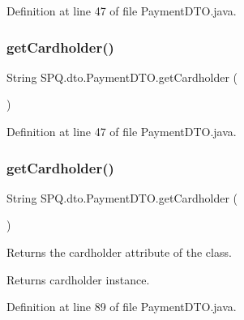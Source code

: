 Definition at line 47 of file Payment\+D\+T\+O.\+java.

\mbox{\label{class_s_p_q_1_1dto_1_1_payment_d_t_o_ac4812465bc4dd874aad6269fe8486e0b}} 
\subsubsection{\texorpdfstring{get\+Cardholder()}{getCardholder()}\hspace{0.1cm}{\footnotesize\ttfamily [2/3]}}
{\footnotesize\ttfamily String S\+P\+Q.\+dto.\+Payment\+D\+T\+O.\+get\+Cardholder (\begin{DoxyParamCaption}{ }\end{DoxyParamCaption})}



Definition at line 47 of file Payment\+D\+T\+O.\+java.

\mbox{\label{class_s_p_q_1_1dto_1_1_payment_d_t_o_ac4812465bc4dd874aad6269fe8486e0b}} 
\subsubsection{\texorpdfstring{get\+Cardholder()}{getCardholder()}\hspace{0.1cm}{\footnotesize\ttfamily [3/3]}}
{\footnotesize\ttfamily String S\+P\+Q.\+dto.\+Payment\+D\+T\+O.\+get\+Cardholder (\begin{DoxyParamCaption}{ }\end{DoxyParamCaption})}

Returns the cardholder attribute of the class. \begin{DoxyReturn}{Returns}
cardholder instance. 
\end{DoxyReturn}


Definition at line 89 of file Payment\+D\+T\+O.\+java.

